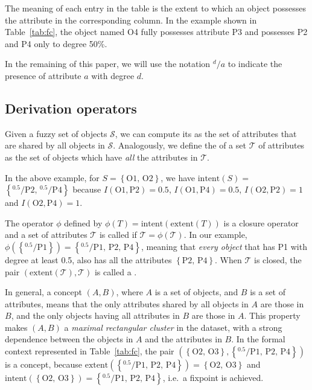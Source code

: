 The meaning of each entry in the table is the extent to which an object
possesses the attribute in the corresponding column. In the example
shown in Table~\ref{tab:fc}, the object named O4 fully possesses
attribute P3 and possesses P2 and P4 only to degree 50\%.

In the remaining of this paper, we will use the notation \(^{d\!}/a\) to
indicate the presence of attribute \(a\) with degree \(d\).

\hypertarget{derivation-operators}{%
\subsection{Derivation operators}\label{derivation-operators}}

Given a fuzzy set of objects \(\mathcal{S}\), we can compute its
 as the set of attributes that are shared by all objects in
\(\mathcal{S}\). Analogously, we define the  of a set
\(\mathcal{T}\) of attributes as the set of objects which have
\emph{all} the attributes in \(\mathcal{T}\).

In the above example, for
\(S=\)\ensuremath{\left\{\mathrm{O1},\, \mathrm{O2}\right\}}, we have
\(\text{intent}(S)=\)\ensuremath{\left\{{^{0.5}}\!/\mathrm{P2},\, {^{0.5}}\!/\mathrm{P4}\right\}}
because \(I(\mathrm{O1}, \mathrm{P2}) = 0.5\),
\(I(\mathrm{O1}, \mathrm{P4}) = 0.5\),
\(I(\mathrm{O2}, \mathrm{P2}) = 1\) and
\(I(\mathrm{O2}, \mathrm{P4}) = 1\).

The operator \(\phi\) defined by
\(\phi(T) = \text{intent}(\text{extent}(T))\) is a closure operator and
a set of attributes \(\mathcal{T}\) is called  if
\(\mathcal{T} = \phi(\mathcal{T})\). In our example,
\(\phi(\ensuremath{\left\{{^{0.5}}\!/\mathrm{P1}\right\}}) = \ensuremath{\left\{{^{0.5}}\!/\mathrm{P1},\, \mathrm{P2},\, \mathrm{P4}\right\}}\),
meaning that \emph{every object} that has P1 with degree at least 0.5,
also has all the attributes
\ensuremath{\left\{\mathrm{P2},\, \mathrm{P4}\right\}}. When
\(\mathcal{T}\) is closed, the pair
\((\text{extent}(\mathcal{T}), \mathcal{T})\) is called a .

In general, a concept \((A, B)\), where \(A\) is a set of objects, and
\(B\) is a set of attributes, means that the only attributes shared by
all objects in \(A\) are those in \(B\), and the only objects having all
attributes in \(B\) are those in \(A\). This property makes \((A, B)\) a
\emph{maximal rectangular cluster} in the dataset, with a strong
dependence between the objects in \(A\) and the attributes in \(B\). In
the formal context represented in Table~\ref{tab:fc}, the pair
\ensuremath{\left(\ensuremath{\left\{\mathrm{O2},\, \mathrm{O3}\right\}}, \ensuremath{\left\{{^{0.5}}\!/\mathrm{P1},\, \mathrm{P2},\, \mathrm{P4}\right\}}\right)}
is a concept, because
\(\text{extent}(\ensuremath{\left\{{^{0.5}}\!/\mathrm{P1},\, \mathrm{P2},\, \mathrm{P4}\right\}})=\ensuremath{\left\{\mathrm{O2},\, \mathrm{O3}\right\}}\)
and
\(\text{intent}(\ensuremath{\left\{\mathrm{O2},\, \mathrm{O3}\right\}})=\ensuremath{\left\{{^{0.5}}\!/\mathrm{P1},\, \mathrm{P2},\, \mathrm{P4}\right\}}\),
i.e.~a fixpoint is achieved.

